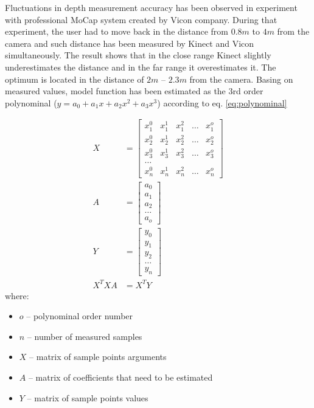 \documentclass{llncs}
\begin{document}
Fluctuations in depth measurement accuracy has been observed in experiment with professional MoCap system created by Vicon company. During that experiment, the user had to move back in the distance from $0.8m$ to $4m$ from the camera and such distance has been measured by Kinect and Vicon simultaneously. The result shows that in the close range Kinect slightly underestimates the distance and in the far range it overestimates it. The optimum is located in the distance of $2m$ -- $2.3m$ from the camera.  Basing on measured values, model function has been estimated as the 3rd order polynominal ($y = a_0 + a_1x + a_2x^2 + a_3x^3$) according to eq. \eqref{eq:polynominal}
		
\begin{equation}
	\begin{split}
		X &= 	\begin{bmatrix}
		x_1^0&x_1^1&x_1^2&\dots&x_1^o\\			
		x_2^0&x_2^1&x_2^2&\dots&x_2^o\\
		x_3^0&x_3^1&x_3^2&\dots&x_3^o\\
		\dots\\
		x_n^0&x_n^1&x_n^2&\dots&x_n^o
		\end{bmatrix} \\
		A &= 	\begin{bmatrix}
		a_0\\a_1\\a_2\\\dots\\a_o
		\end{bmatrix} \\
		Y &= 
		\begin{bmatrix}
			y_0 \\y_1\\y_2\\\dots\\y_n
		\end{bmatrix} \\
		X^TXA &= X^TY
	\end{split}
	\label{eq:polynominal}
\end{equation}
where:
\begin{itemize}
	\item $o$ -- polynominal order number
	\item $n$ -- number of measured samples
	\item $X$ -- matrix of sample points arguments
	\item $A$ -- matrix of coefficients that need to be estimated
	\item $Y$ -- matrix of sample points values
\end{itemize}
		
\end{document}
